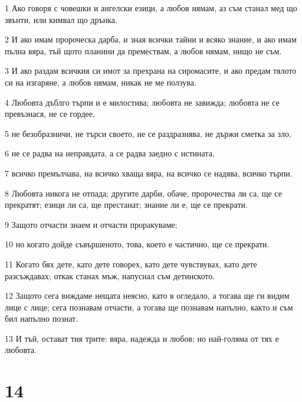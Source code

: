 \par 1 Ако говоря с човешки и ангелски езици, а любов нямам, аз съм станал мед що звънти, или кимвал що дрънка.
\par 2 И ако имам пророческа дарба, и зная всички тайни и всяко знание, и ако имам пълна вяра, тъй щото планини да премествам, а любов нямам, нищо не съм.
\par 3 И ако раздам всичкия си имот за прехрана на сиромасите, и ако предам тялото си на изгаряне, а любов нямам, никак не ме ползува.
\par 4 Любовта дъблго търпи и е милостива; любовта не завижда; любовта не се превъзнася, не се гордее,
\par 5 не безобразничи, не търси своето, не се раздразнява, не държи сметка за зло,
\par 6 не се радва на неправдата, а се радва заедно с истината,
\par 7 всичко премълчава, на всичко хваща вяра, на всичко се надява, всичко търпи.
\par 8 Любовта никога не отпада; другите дарби, обаче, пророчества ли са, ще се прекратят; езици ли са, ще престанат; знание ли е, ще се прекрати.
\par 9 Защото отчасти знаем и отчасти проракуваме;
\par 10 но когато дойде съвършеното, това, което е частично, ще се прекрати.
\par 11 Когато бях дете, като дете говорех, като дете чувствувах, като дете разсъждавах; откак станах мъж, напуснал съм детинското.
\par 12 Защото сега виждаме нещата неясно, като в огледало, а тогава ще ги видим лице с лице; сега познавам отчасти, а тогава ще познавам напълно, както и съм бил напълно познат.
\par 13 И тъй, остават тия трите: вяра, надежда и любов; но най-голяма от тях е любовта.

\chapter{14}


